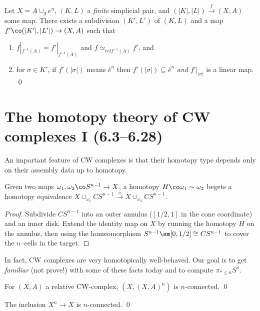 \begin{lemma}
Let $X = A \cup_g e^n$, $(K, L)$ a \emph{finite} simplicial pair, and $(|K|, |L|) \xrightarrow{f} (X, A)$ some map.  There exists a subdivision $(K', L')$ of $(K, L)$ and a map $f'\co (|K'|, |L'|) \to (X, A)$ such that
\begin{enumerate}
    \item $f|_{f^{-1}(A)} = f'|_{f^{-1}(A)}$ and $f \simeq_{rel f^{-1}(A)} f'$, and
    \item for $\sigma \in K'$, if $f'(|\sigma|)$ means $\overset \circ e^n$ then $f'(|\sigma|) \subseteq \overset \circ e^n$ \emph{and} $f'|_{|\sigma|}$ is a linear map. \qed
\end{enumerate}
\end{lemma}





\section{The homotopy theory of CW complexes I (6.3--6.28)}

An important feature of CW complexes is that their homotopy type depends only on their assembly data up to homotopy.

\begin{lemma}
Given two maps $\omega_1, \omega_2\co S^{n-1} \to X$, a homotopy $H\co \omega_1 \sim \omega_2$ begets a homotopy equivalence $X \cup_{\omega_1} CS^{n-1} \xrightarrow{\simeq} X \cup_{\omega_2} CS^{n-1}$.
\end{lemma}
\begin{proof}
Subdivide $CS^{n-1}$ into an outer annulus ($[1/2, 1]$ in the cone coordinate) and an inner disk.  Extend the identity map on $X$ by running the homotopy $H$ on the annulus, then using the homeomorphism $S^{n-1} \sm [0, 1/2] \cong CS^{n-1}$ to cover the $n$--cells in the target.
\end{proof}

In fact, CW complexes are very homotopically well-behaved.  Our goal is to get \emph{familiar} (not prove!) with some of these facts today and to compute $\pi_{* \le n} S^n$.

\begin{lemma}
For $(X, A)$ a relative CW-complex, $(X, (X, A)^n)$ is $n$-connected. \qed
\end{lemma}

\begin{corollary}
The inclusion $X^n \to X$ is $n$-connected. \qed
\end{corollary}

